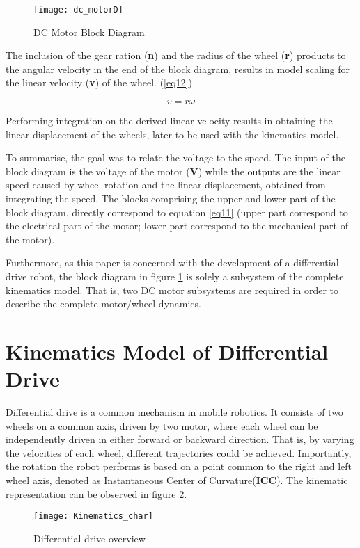 \begin{figure}[h]
\centering
\texttt{[image: dc\_motorD]}
\caption{DC Motor Block Diagram}
\label{fig::dcmfigure}
\end{figure}

The inclusion of the gear ration (\textbf{n}) and the radius of the wheel (\textbf{r}) products to the angular velocity in the end of the block diagram, results in model scaling for the linear velocity (\textbf{v}) of the wheel. (\ref{eq12})

\begin{equation} \label{eq12}
v = r\omega
\end{equation}

Performing integration on the derived linear velocity results in obtaining the linear displacement of the wheels, later to be used with the kinematics model. 

To summarise, the goal was to relate the voltage to the speed. The input of the block diagram is the voltage of the motor (\textbf{V}) while the outputs are the linear speed caused by wheel rotation and the linear displacement, obtained from integrating the speed. The blocks comprising the upper and lower part of the block diagram, directly correspond to equation \ref{eq11} (upper part correspond to the electrical part of the motor; lower part correspond to the mechanical part of the motor).

Furthermore, as this paper is concerned with the development of a differential drive robot, the block diagram in figure \ref{fig::dcmfigure} is solely a subsystem of the complete kinematics model. That is, two DC motor subsystems are required in order to describe the complete motor/wheel dynamics. 

\section{Kinematics Model of Differential Drive}

Differential drive is a common mechanism in mobile robotics. It consists of two wheels on a common axis, driven by two motor, where each wheel can be independently driven in either forward or backward direction. That is, by varying the velocities of each wheel, different  trajectories could be achieved. Importantly, the rotation the robot performs is based on a point common to the right and left wheel axis, denoted as Instantaneous Center of Curvature(\textbf{ICC}). The kinematic representation can be observed in figure \ref{fig::diff_drive_over}.

\begin{figure}[h]
\centering
\texttt{[image: Kinematics\_char]}
\caption{Differential drive overview}
\label{fig::diff_drive_over}
\end{figure}





